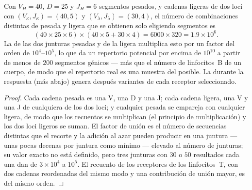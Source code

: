 \begin{theorem}\label{thm:b3:adaptive-immunity:repertoire}
Con $V_{H} = 40$, $D = 25$ y $J_{H} = 6$ segmentos pesados, y cadenas
ligeras de dos loci con $(V_{\kappa}, J_{\kappa}) = (40, 5)$ y
$(V_{\lambda}, J_{\lambda}) = (30, 4)$, el número de combinaciones
distintas de pesada y ligera que se obtienen solo eligiendo segmentos es
\[
(40\times 25\times 6)\times(40\times 5 + 30\times 4) = 6000\times 320
= 1.9\times 10^{6}.
\]
La  de las dos junturas pesadas y de la ligera
multiplica esto por un factor del orden de $10^{4}$--$10^{5}$, lo que da
un repertorio potencial por encima de $10^{10}$ a partir de menos de
$200$ segmentos génicos --- más que el número de linfocitos~B de un
cuerpo, de modo que el repertorio real es una muestra del posible. La
 durante la respuesta (más abajo) genera después
variantes de cada receptor seleccionado.
\end{theorem}
\begin{proof}
Cada cadena pesada es una V, una D y una J; cada cadena ligera, una V y
una J de cualquiera de los dos loci; y cualquier pesada se empareja con
cualquier ligera, de modo que los recuentos se multiplican (el principio
de multiplicación) y los dos loci ligeros se suman. El factor de unión es
el número de secuencias distintas que el recorte y la adición al azar
pueden producir en una juntura --- unas pocas decenas por juntura como
mínimo --- elevado al número de junturas; su valor exacto no está
definido, pero tres junturas con $30$ o $50$ resultados cada una dan de
$3\times 10^{4}$ a $10^{5}$. El recuento de los receptores de los
linfocitos~T, con dos cadenas reordenadas del mismo modo y una
contribución de unión mayor, es del mismo orden.
\end{proof}

